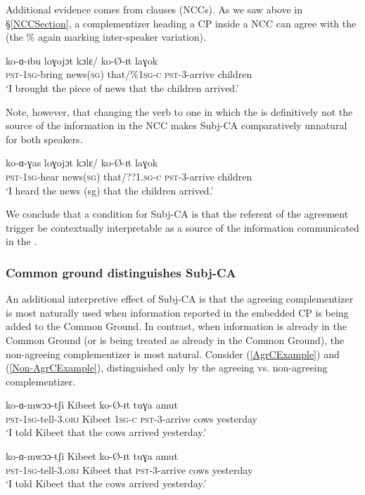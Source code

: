 \documentclass[output=paper,newtxmath,modfonts,nonflat,hidelinks]{langsci/langscibook}
\begin{document}
Additional evidence comes from  clauses (NCCs). As we saw above in \S \ref{NCCSection}, a complementizer heading a CP inside a NCC can agree with the   (the \% again marking inter-speaker variation). 

\ea
\gll ko-ɑ-ɪbu loɣojɔt kɔlɛ/ ko-\O-ɪt laɣok \\
\textsc{pst}-1\textsc{sg}-bring news(\textsc{sg}) that/\%1\textsc{sg-c} \textsc{pst}-3-arrive children \\
\glt `I brought the piece of news that the children arrived.'
\z

\noindent Note, however, that changing the verb to one in which the  is definitively not the source of the information in the NCC makes Subj-CA comparatively unnatural for both speakers. 

\ea
\gll ko-ɑ-ɣas loɣojɔt kɔlɛ/ ko-\O-ɪt laɣok \\
\textsc{pst}-1\textsc{sg}-hear news(\textsc{sg}) that/??1.\textsc{sg-c} \textsc{pst}-3-arrive children \\
\glt `I heard the news (sg) that the children arrived.'
\z

\noindent We conclude that a condition for Subj-CA is that the referent of the agreement trigger be contextually interpretable as a source of the information communicated in the . 

\subsubsection{Common ground distinguishes Subj-CA}

An additional interpretive effect of Subj-CA is that the agreeing complementizer is most naturally used when information reported in the embedded CP is being added to the Common Ground. In contrast, when information is already in the Common Ground (or is being treated as already in the Common Ground), the non-agreeing complementizer is most natural. Consider (\ref{AgrCExample}) and (\ref{Non-AgrCExample}), distinguished only by the agreeing vs. non-agreeing complementizer. 

\ea
\settowidth{}
\begin{xlist}

\ex \label{AgrCExample}
\gll ko-ɑ-mwɔɔ-tʃi Kibeet  ko-\O-ɪt tuɣa amut \\ 
\textsc{pst}-1\textsc{sg}-tell-3.\textsc{obj} Kibeet 1\textsc{sg-c} \textsc{pst}-3-arrive cows yesterday \\ %
\glt `I told Kibeet that the cows arrived yesterday.'

\ex \label{Non-AgrCExample}
\gll ko-ɑ-mwɔɔ-tʃi Kibeet  ko-\O-ɪt tuɣa amut \\ 
\textsc{pst}-1\textsc{sg}-tell-3.\textsc{obj} Kibeet that \textsc{pst}-3-arrive cows yesterday \\ %
\glt `I told Kibeet that the cows arrived yesterday.'

\end{xlist}
\z
\end{document}
